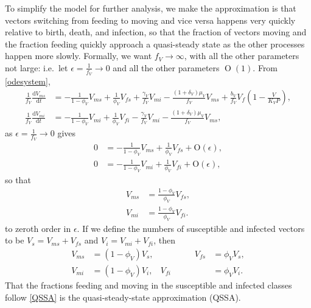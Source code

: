 \documentclass{article}
\newcommand{\md}{\mathrm{d}}
\begin{document}
To simplify the model for further analysis, we make the approximation
is that vectors switching from feeding to moving and vice versa
happens very quickly relative to birth, death, and infection, so that
the fraction of vectors moving and the fraction feeding quickly
approach a quasi-steady state as the other processes happen more
slowly.  Formally, we want $f_V \to \infty$, with
all the other parameters not large: i.e.~let $\epsilon =
\frac{1}{f_V} \to 0$ and all the other parameters
$\operatorname{O}(1)$.  From
\eqref{odesystem},
\begin{equation}
  \begin{split}
    \frac{1}{f_V} \frac{\md V_{ms}}{\md t}
    &=
    - \frac{1}{1 - \phi_V} V_{ms}
    + \frac{1}{\phi_V}  V_{fs}
    + \frac{\gamma_V}{f_V} V_{mi}
    - \frac{(1 + \delta_V) \mu_V}{f_V} V_{ms}
    + \frac{b_V}{f_V} V_f \left(1 - \frac{V}{K_V P}\right),
    \\
    \frac{1}{f_V} \frac{\md V_{mi}}{\md t}
    &=
    - \frac{1}{1 - \phi_V} V_{mi}
    + \frac{1}{\phi_V} V_{fi}
    - \frac{\gamma_V}{f_V} V_{mi}
    - \frac{(1 + \delta_V) \mu_V}{f_V} V_{ms},
  \end{split}
\end{equation}
as $\epsilon = \frac{1}{f_V} \to 0$ gives
\begin{equation}
  \begin{split}
    0 &= - \frac{1}{1 - \phi_V} V_{ms} + \frac{1}{\phi_V} V_{fs} + \mathrm{O}(\epsilon),
    \\
    0 &= - \frac{1}{1 - \phi_V} V_{mi} + \frac{1}{\phi_V} V_{fi} + \mathrm{O}(\epsilon),
  \end{split}
\end{equation}
so that
\begin{equation}
  \begin{split}
    V_{ms} &= \frac{1 - \phi_V}{\phi_V} V_{fs},
    \\
    V_{mi} &= \frac{1 - \phi_V}{\phi_V} V_{fi}.
  \end{split}
\end{equation}
to zeroth order in $\epsilon$.  If we define the numbers of
susceptible and infected vectors to be $V_s = V_{ms} + V_{fs}$ and
$V_i = V_{mi} + V_{fi}$, then
\begin{equation}
  \label{QSSA}
  \begin{aligned}
    V_{ms} &= (1 - \phi_V) V_s,
    & \quad\quad\quad\quad
    V_{fs} &= \phi_V V_s,
    \\
    V_{mi} &= (1 - \phi_V) V_i,
    &
    V_{fi} &= \phi_V V_i.
  \end{aligned}
\end{equation}
That the fractions feeding and moving in the susceptible and infected
classes follow \eqref{QSSA} is the quasi-steady-state approximation
(QSSA).
\end{document}
